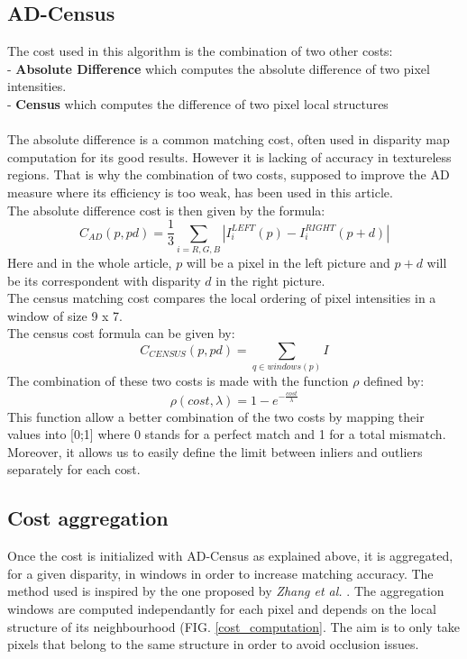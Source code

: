 \documentclass{ipol}
\begin{document}
\subsection{AD-Census}

The cost used in this algorithm is the combination of two other costs:\\
	- \textbf{ Absolute Difference} which computes the absolute difference of two pixel intensities.\\
	- \textbf{ Census} which computes the difference of two pixel local structures\\
\\ 
The absolute difference is a common matching cost, often used in disparity map computation for its good results. However it is lacking of accuracy in textureless regions. That is why the combination of two costs, supposed to improve the AD measure where its efficiency is too weak, has been used in this article.\\
The absolute difference cost is then given by the formula:
\[
	C_{AD}(p, pd) = \frac{1}{3} \sum_{i = R, G, B}  | I_i^{LEFT}(p) - I_i^{RIGHT}(p+d) | 
\]
Here and in the whole article, $p$ will be a pixel in the left picture and $p + d$ will be its correspondent with disparity $d$ in the right picture.\\
The census matching cost compares the local ordering of pixel intensities in a window of size 9 x 7.\\
The census cost formula can be given by:
\[
	C_{CENSUS}(p, pd) = \sum_{q \in windows(p)} I
\]
The combination of these two costs is made with the function $\rho$ defined by:
\[
	\rho(cost, \lambda) = 1 - e^{-\frac{cost}{\lambda}}
\]
This function allow a better combination of the two costs by mapping their values into [0;1] where 0 stands for a perfect match and 1 for a total mismatch. Moreover, it allows us to easily define the limit between inliers and outliers separately for each cost.\\

\subsection{ Cost aggregation }

Once the cost is initialized with AD-Census as explained above, it is aggregated, for a given disparity, in windows in order to increase matching accuracy. The method used is inspired by the one proposed by \textit{ Zhang et al.} \cite{costAggreg}.
The aggregation windows are computed independantly for each pixel and depends on the local structure of its neighbourhood (FIG. \ref{cost_computation}. The aim is to only take pixels that belong to the same structure in order to avoid occlusion issues.\\
\end{document}
